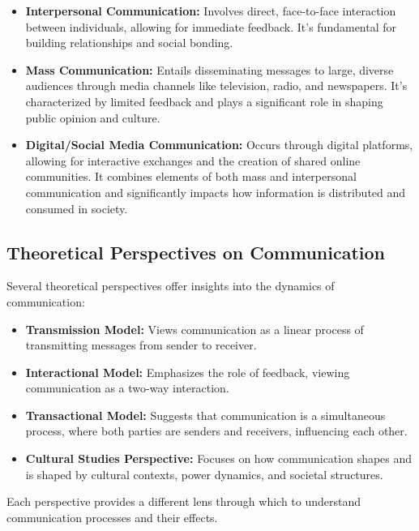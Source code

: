 \documentclass[
]{book}
\providecommand{\tightlist}{%
  \setlength{\itemsep}{0pt}\setlength{\parskip}{0pt}}
\begin{document}
\begin{itemize}
\tightlist
\item
  \textbf{Interpersonal Communication:} Involves direct, face-to-face interaction between individuals, allowing for immediate feedback. It's fundamental for building relationships and social bonding.
\item
  \textbf{Mass Communication:} Entails disseminating messages to large, diverse audiences through media channels like television, radio, and newspapers. It's characterized by limited feedback and plays a significant role in shaping public opinion and culture.
\item
  \textbf{Digital/Social Media Communication:} Occurs through digital platforms, allowing for interactive exchanges and the creation of shared online communities. It combines elements of both mass and interpersonal communication and significantly impacts how information is distributed and consumed in society.
\end{itemize}

\hypertarget{theoretical-perspectives-on-communication}{%
\subsection*{Theoretical Perspectives on Communication}\label{theoretical-perspectives-on-communication}}

Several theoretical perspectives offer insights into the dynamics of communication:

\begin{itemize}
\tightlist
\item
  \textbf{Transmission Model:} Views communication as a linear process of transmitting messages from sender to receiver.
\item
  \textbf{Interactional Model:} Emphasizes the role of feedback, viewing communication as a two-way interaction.
\item
  \textbf{Transactional Model:} Suggests that communication is a simultaneous process, where both parties are senders and receivers, influencing each other.
\item
  \textbf{Cultural Studies Perspective:} Focuses on how communication shapes and is shaped by cultural contexts, power dynamics, and societal structures.
\end{itemize}

Each perspective provides a different lens through which to understand communication processes and their effects.
\end{document}

